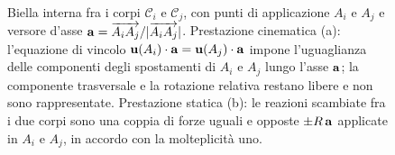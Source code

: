 \begin{figure}[htbp]
{
	}
	\caption[Biella interna fra due corpi: prestazioni cinematica e statica.]{%
		Biella interna fra i corpi $\mathcal{C}_i$ e $\mathcal{C}_j$,
		con punti di applicazione $A_i$ e $A_j$ e versore d'asse
		$\mathbf{a} = \overrightarrow{A_iA_j}/|\overrightarrow{A_iA_j}|$.
		Prestazione cinematica (a): l'equazione di vincolo
		$\mathbf{u}(A_i)\cdot\mathbf{a} = \mathbf{u}(A_j)\cdot\mathbf{a}$ impone l'uguaglianza
		delle componenti degli spostamenti di $A_i$ e $A_j$ lungo
		l'asse $\mathbf{a}$; la componente trasversale e la rotazione
		relativa restano libere e non sono rappresentate.
		Prestazione statica (b): le reazioni scambiate fra i due
		corpi sono una coppia di forze uguali e opposte
		$\pm R\,\mathbf{a}$ applicate in $A_i$ e $A_j$, in accordo con la
		molteplicità uno.}
	\label{fig:pendolo_interno}
\end{figure}
